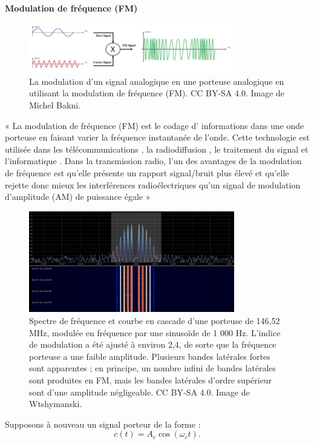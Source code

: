 \textbf{Modulation de fréquence (FM)}
\begin{figure}[H] %
    \centering
    \includegraphics[width=0.8\textwidth]{figures/6-36.jpg}
    \caption{La modulation d'un signal analogique en une porteuse analogique en utilisant la modulation de fréquence (FM). CC BY-SA 4.0. Image de Michel Bakni.}
    \label{fig:communication2}
\end{figure}
« La modulation de fréquence (FM) est le codage d' informations dans une onde porteuse en faisant varier la fréquence instantanée de l'onde. Cette technologie est utilisée dans les télécommunications , la radiodiffusion , le traitement du signal et l'informatique . Dans la transmission radio, l'un des avantages de la modulation de fréquence est qu'elle présente un rapport signal/bruit plus élevé et qu'elle rejette donc mieux les interférences radioélectriques qu'un signal de modulation d'amplitude (AM) de puissance égale » 
\begin{figure}[H] %
    \centering
    \includegraphics[width=0.8\textwidth]{figures/6-37.jpg}
    \caption{Spectre de fréquence et courbe en cascade d'une porteuse de 146,52 MHz, modulée en fréquence par une sinusoïde de 1 000 Hz. L'indice de modulation a été ajusté à environ 2,4, de sorte que la fréquence porteuse a une faible amplitude. Plusieurs bandes latérales fortes sont apparentes ; en principe, un nombre infini de bandes latérales sont produites en FM, mais les bandes latérales d'ordre supérieur sont d'une amplitude négligeable. CC BY-SA 4.0. Image de Wtshymanski.}
    \label{fig:communication2}
\end{figure}
Supposons à nouveau un signal porteur de la forme :  
\[
c(t) = A_c \cos(\omega_c t).
\]
